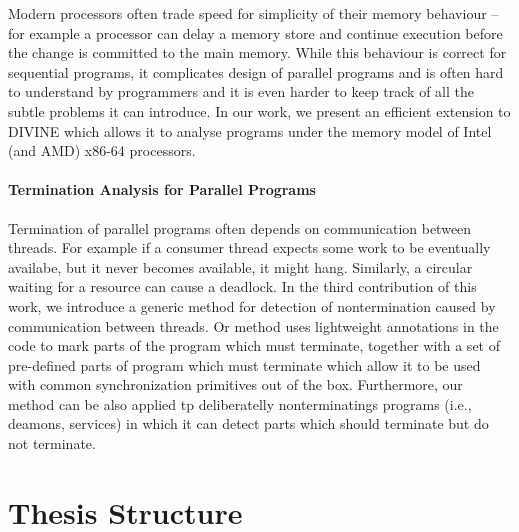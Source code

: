 Modern processors often trade speed for simplicity of their memory behaviour -- for example a processor can delay a memory store and continue execution before the change is committed to the main memory.
While this behaviour is correct for sequential programs, it complicates design of parallel programs and is often hard to understand by programmers and it is even harder to keep track of all the subtle problems it can introduce.
In our work, we present an efficient extension to DIVINE which allows it to analyse programs under the memory model of Intel (and AMD) x86-64 processors.

\paragraph{Termination Analysis for Parallel Programs}

Termination of parallel programs often depends on communication between threads.
For example if a consumer thread expects some work to be eventually availabe, but it never becomes available, it might hang.
Similarly, a circular waiting for a resource can cause a deadlock.
In the third contribution of this work, we introduce a generic method for detection of nontermination caused by communication between threads.
Or method uses lightweight annotations in the code to mark parts of the program which must terminate, together with a set of pre-defined parts of program which must terminate which allow it to be used with common synchronization primitives out of the box.
Furthermore, our method can be also applied tp deliberatelly nonterminatings programs (i.e., deamons, services) in which it can detect parts which should terminate but do not terminate.

\section{Thesis Structure}
